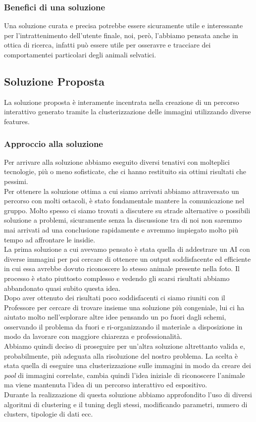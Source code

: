 \documentclass[12pt,a4paper,twoside]{article}
\begin{document}
\subsubsection{Benefici di una soluzione}
Una soluzione curata e precisa potrebbe essere sicuramente utile e interessante per l'intrattenimento 
dell'utente finale, noi, però, l'abbiamo pensata anche in ottica di ricerca, infatti può essere utile per 
osseravre e tracciare dei comportamentei particolari degli animali selvatici.

\subsection{Soluzione Proposta}
La soluzione proposta è interamente incentrata nella creazione di un percorso interattivo generato tramite 
la clusterizzazione delle immagini utilizzando diverse features.
\subsubsection{Approccio alla soluzione}
Per arrivare alla soluzione abbiamo eseguito diversi tenativi con molteplici tecnologie, più o meno 
sofisticate, che ci hanno restituito sia ottimi risultati che pessimi.\\
Per ottenere la soluzione ottima a cui siamo arrivati abbiamo attraversato un percorso con molti ostacoli, 
è stato fondamentale mantere la comunicazione nel gruppo. Molto spesso ci siamo trovati a discutere su 
strade alternative o possibili soluzione a problemi, sicuramente senza la discussione tra di noi non 
saremmo mai arrivati ad una conclusione rapidamente e avremmo impiegato molto più tempo ad affrontare le 
insidie.\\
La prima soluzione a cui avevamo pensato è stata quella di addestrare un AI con diverse immagini per poi 
cercare di ottenere un output soddisfacente ed efficiente in cui essa avrebbe dovuto riconoscere lo stesso 
animale presente nella foto. Il processo è stato piuttosto complesso e vedendo gli scarsi risultati abbiamo 
abbandonato quasi subito questa idea.\\
Dopo aver ottenuto dei risultati poco soddisfacenti ci siamo riuniti con il Professore per cercare di 
trovare insieme una soluzione più congeniale, lui ci ha aiutato molto nell'esplorare altre idee pensando un 
po fuori dagli schemi, osservando il problema da fuori e ri-organizzando il materiale a disposizione in 
modo da lavorare con maggiore chiarezza e professionalità.\\
Abbiamo quindi deciso di proseguire per un'altra soluzione altrettanto valida e, probabilmente, più adeguata 
alla risoluzione del nostro problema. La scelta è stata quella di eseguire una clusterizzazione sulle 
immagini in modo da creare dei \textit{pool} di immagini correlate, cambia quindi l'idea iniziale di 
riconoscere l'animale ma viene mantenuta l'idea di un percorso interattivo ed espositivo.\\
Durante la realizzazione di questa soluzione abbiamo approfondito l'uso di diversi algoritmi di clustering 
e il tuning degli stessi, modificando parametri, numero di clusters, tipologie di dati ecc.
\end{document}
